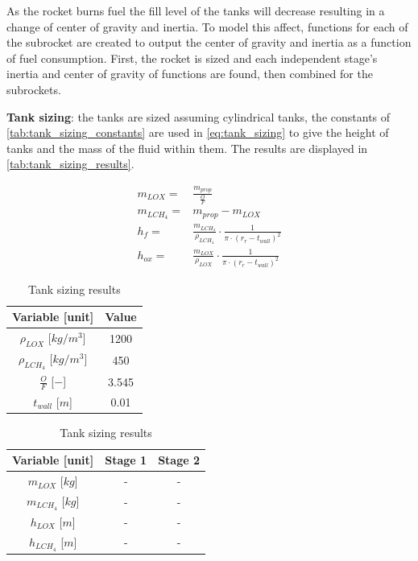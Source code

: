
As the rocket burns fuel the fill level of the tanks will decrease resulting in a change of center of gravity and inertia. To model this affect, functions for each of the subrocket are created to output the center of gravity and inertia as a function of fuel consumption. First, the rocket is sized and each independent stage's inertia and center of gravity of functions are found, then combined for the subrockets.

\textbf{Tank sizing}: the tanks are sized assuming cylindrical tanks, the constants of \autoref{tab:tank_sizing_constants} are used in \autoref{eq:tank_sizing} to give the height of tanks and the mass of the fluid within them. The results are displayed in \autoref{tab:tank_sizing_results}.

\begin{equation}
\begin{aligned}
    m_{LOX} =& \frac{m_{prop}}{\frac{O}{F}} \\
    m_{LCH_4} =& m_{prop} - m_{LOX} \\
    h_f =& \frac{m_{LCH_4}}{\rho_{LCH_4}} \cdot \frac{1}{\pi \cdot (r_r - t_{wall})^2} \\
    h_{ox} =& \frac{m_{LOX}}{\rho_{LOX}} \cdot \frac{1}{\pi \cdot (r_r - t_{wall})^2}
\end{aligned}
\label{eq:tank_sizing}
\end{equation}

\begin{table}[H]
    \centering
    \begin{minipage}{0.45\textwidth}
        \centering
        \caption{Tank sizing constants}
        \begin{tabular}{|c|c|}
             \hline
             Variable [unit] & Value \\ \hline
             $\rho_{LOX}$ [$kg/m^3$] & 1200 \\
             $\rho_{LCH_4}$ [$kg/m^3$] & 450 \\
             $\frac{O}{F}$ [$-$] & 3.545 \\
             $t_{wall}$ [$m$] & 0.01 \\
             \hline
        \end{tabular}
        \label{tab:tank_sizing_constants}
    \end{minipage}%
    \hspace{0.05\textwidth}
    \begin{minipage}{0.45\textwidth}
        \centering
        \caption{Tank sizing results}
        \begin{tabular}{|c|c|c|}
            \hline
             Variable [unit] & Stage 1 & Stage 2 \\ \hline
             $m_{LOX}$ [$kg$] & - & - \\
             $m_{LCH_4}$ [$kg$] & - & - \\
             $h_{LOX}$ [$m$] & - & - \\
             $h_{LCH_4}$ [$m$] & - & - \\ \hline
        \end{tabular}
        \label{tab:tank_sizing_results}
    \end{minipage}
\end{table}

